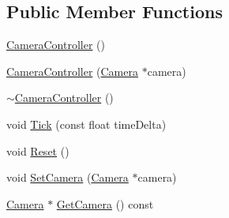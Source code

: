 \subsection*{Public Member Functions}
\begin{DoxyCompactItemize}
\item 
\mbox{\hyperlink{classec_1_1_camera_controller_a53fd061c49374fd8f1194cecac1e35aa}{Camera\+Controller}} ()
\item 
\mbox{\hyperlink{classec_1_1_camera_controller_a9edd8fff13533c84c7ea8f7f10f16580}{Camera\+Controller}} (\mbox{\hyperlink{classec_1_1_camera}{Camera}} $\ast$camera)
\item 
\mbox{\hyperlink{classec_1_1_camera_controller_a3229bd664f0d7d00b90fc3c9a852768c}{$\sim$\+Camera\+Controller}} ()
\item 
void \mbox{\hyperlink{classec_1_1_camera_controller_a0f9378014e5501eec0af79fd7006a4d7}{Tick}} (const float time\+Delta)
\item 
void \mbox{\hyperlink{classec_1_1_camera_controller_aad9552da91386535de9dc1b106f941aa}{Reset}} ()
\item 
void \mbox{\hyperlink{classec_1_1_camera_controller_a3cbf6829af7035fa648ef9283f1f6b34}{Set\+Camera}} (\mbox{\hyperlink{classec_1_1_camera}{Camera}} $\ast$camera)
\item 
\mbox{\hyperlink{classec_1_1_camera}{Camera}} $\ast$ \mbox{\hyperlink{classec_1_1_camera_controller_a25865e00f787b3e086167e455cbfc3d7}{Get\+Camera}} () const
\end{DoxyCompactItemize}
